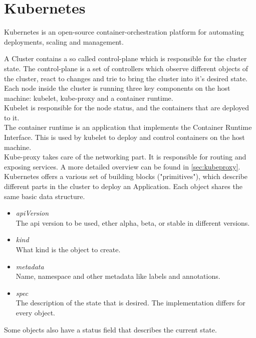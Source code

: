 \section{Kubernetes}

Kubernetes is an open-source container-orchestration platform for automating deployments, scaling and management.

A Cluster contains a so called control-plane which is responsible for the cluster state.
The control-plane is a set of controllers which observe different objects of the cluster, react to changes and trie to bring the cluster into it's desired state.
\\
Each node inside the cluster is running three key components on the host machine: kubelet, kube-proxy and a container runtime.
\\
Kubelet is responsible for the node status, and the containers that are deployed to it.
\\
The container runtime is an application that implements the Container Runtime Interface.
This is used by kubelet to deploy and control containers on the host machine.
\\
Kube-proxy takes care of the networking part.
It is responsible for routing and exposing services.
A more detailed overview can be found in \autoref{sec:kubeproxy}.
\\
\newpage
Kubernetes offers a various set of building blocks ("primitives"), which describe different parts in the cluster to deploy an Application.
Each object shares the same basic data structure.

\begin{itemize}
    \item \textit{apiVersion} \\
    The api version to be used, ether alpha, beta, or stable in different versions.
    \item \textit{kind} \\
    What kind is the object to create.
    \item \textit{metadata} \\
    Name, namespace and other metadata like labels and annotations.
    \item \textit{spec} \\
    The description of the state that is desired.
    The implementation differs for every object.
\end{itemize}

Some objects also have a status field that describes the current state.

